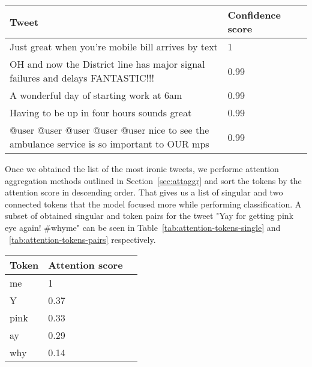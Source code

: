 \documentclass[10pt, a4paper]{article}
\begin{document}
\begin{table*}
\caption{Most Ironic Tweets in the Test Set}
\label{tab:most-ironic-test}
\begin{center}
\begin{tabular}{llr}
\toprule
Tweet & Confidence score\\
\midrule
Just great when you're mobile bill arrives by text                                          & 1 \\
OH and now the District line has major signal failures and delays FANTASTIC!!!              & 0.99 \\
A wonderful day of starting work at 6am                                                     & 0.99 \\
Having to be up in four hours sounds great                                                  & 0.99 \\
@user @user @user @user @user  nice to see the ambulance service is so important to OUR mps & 0.99 \\
\bottomrule
\end{tabular}
\end{center}
\end{table*}

Once we obtained the list of the most ironic tweets, we performe attention aggregation methods outlined in Section~\ref{sec:attaggr} and sort the tokens by the attention score in descending order.
That gives us a list of singular and two connected tokens that the model focused more while performing classification.
A subset of obtained singular and token pairs for the tweet "Yay for getting pink eye again!  \#whyme" can be seen in Table~\ref{tab:attention-tokens-single} and ~\ref{tab:attention-tokens-pairs} respectively.

\begin{table*}
\caption{Single Tokens With Highest Attention}
\label{tab:attention-tokens-single}
\begin{center}
\begin{tabular}{llr}
\toprule
Token & Attention score\\
\midrule
me    & 1 \\
Y     & 0.37 \\
pink  & 0.33 \\
ay    & 0.29 \\
why   & 0.14 \\
\bottomrule
\end{tabular}
\end{center}
\end{table*}
\end{document}
